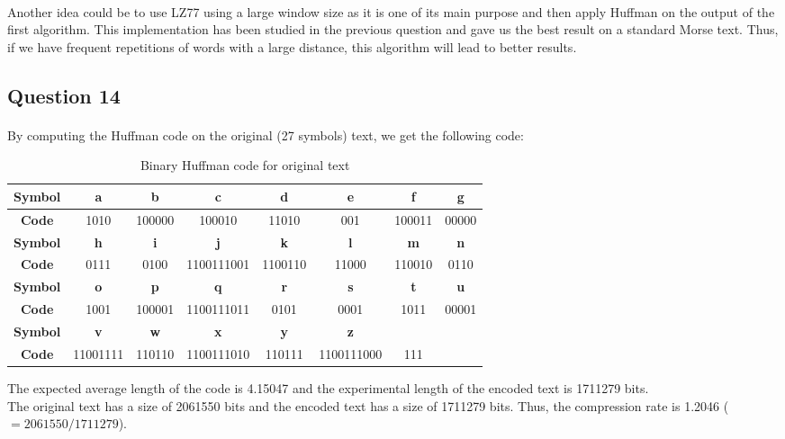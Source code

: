 \documentclass[a4paper, 11pt, oneside]{article}
\begin{document}
\paragraph{}Another idea could be to use LZ77 using a large window size as it is one of its main purpose and then apply Huffman on the output of the first algorithm.
This implementation has been studied in the previous question and gave us the best result on a standard Morse text. Thus, if we have frequent repetitions of words with 
a large distance, this algorithm will lead to better results.

\subsection{Question 14}
\paragraph{}By computing the Huffman code on the original (27 symbols) text, we get the following code:
\begin{table}[H]
    \centering
    \begin{tabular}{|c|c|c|c|c|c|c|c|}
    \hline
    \textbf{Symbol} & \textbf{a} & \textbf{b} & \textbf{c} & \textbf{d} & \textbf{e} & \textbf{f} & \textbf{g} \\ \hline
    \textbf{Code}   & 1010       & 100000     & 100010     & 11010      & 001        & 100011     & 00000      \\ \hline
    \textbf{Symbol} & \textbf{h} & \textbf{i} & \textbf{j} & \textbf{k} & \textbf{l} & \textbf{m} & \textbf{n} \\ \hline
    \textbf{Code}   & 0111       & 0100       & 1100111001 & 1100110    & 11000      & 110010     & 0110       \\ \hline
    \textbf{Symbol} & \textbf{o} & \textbf{p} & \textbf{q} & \textbf{r} & \textbf{s} & \textbf{t} & \textbf{u} \\ \hline
    \textbf{Code}   & 1001       & 100001     & 1100111011 & 0101       & 0001       & 1011       & 00001      \\ \hline
    \textbf{Symbol} & \textbf{v} & \textbf{w} & \textbf{x} & \textbf{y} & \textbf{z} & \textbf{}  & \textbf{}  \\ \hline
    \textbf{Code}   & 11001111   & 110110     & 1100111010 & 110111     & 1100111000 & 111        &            \\ \hline
    \end{tabular}
    \caption{Binary Huffman code for original text}
\end{table}
The expected average length of the code is 4.15047 and the experimental length of the encoded text is 1711279 bits.\\
The original text has a size of 2061550 bits and the encoded text has a size of 1711279 bits. Thus, the compression rate is 1.2046 ($= 2061550/1711279$).
\end{document}
